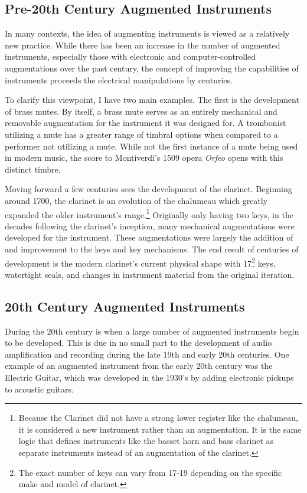 \subsection{Pre-20th Century Augmented Instruments}
In many contexts, the idea of augmenting instruments is viewed as a relatively new practice. While there has been an increase in the number of augmented instruments, especially those with electronic and computer-controlled augmentations over the past century, the concept of improving the capabilities of instruments proceeds the electrical manipulations by centuries.

To clarify this viewpoint, I have two main examples. The first is the development of brass mutes. By itself, a brass mute serves as an entirely mechanical and removable augmentation for the instrument it was designed for. A trombonist utilizing a mute has a greater range of timbral options when compared to a performer not utilizing a mute. While not the first instance of a mute being used in modern music, the score to Montiverdi's 1509 opera \textit{Orfeo} opens with this distinct timbre.

Moving forward a few centuries sees the development of the clarinet. Beginning around 1700, the clarinet is an evolution of the chalumeau which greatly expanded the older instrument's range.\footnote{Because the Clarinet did not have a strong lower register like the chalumeau, it is considered a new instrument rather than an augmentation. It is the same logic that defines instruments like the basset horn and bass clarinet as separate instruments instead of an augmentation of the clarinet.} Originally only having two keys, in the decades following the clarinet's inception, many mechanical augmentations were developed for the instrument. These augmentations were largely the addition of and improvement to the keys and key mechanisms. The end result of centuries of development is the modern clarinet's current physical shape with 17\footnote{The exact number of keys can vary from 17-19 depending on the specific make and model of clarinet.} keys, watertight seals, and changes in instrument material from the original iteration.

\subsection{20th Century Augmented Instruments}
During the 20th century is when a large number of augmented instruments begin to be developed. This is due in no small part to the development of audio amplification and recording during the late 19th and early 20th centuries. One example of an augmented instrument from the early 20th century was the Electric Guitar, which was developed in the 1930's by adding electronic pickups to acoustic guitars.\cite{electric_guit_history}

